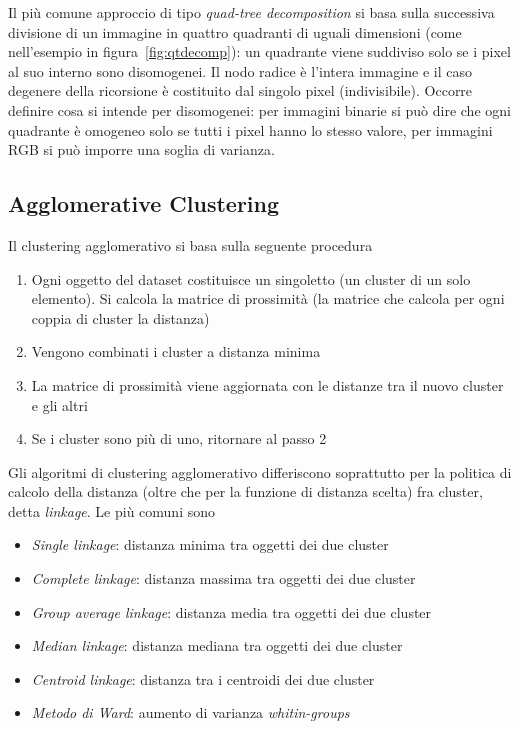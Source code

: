 \documentclass[12pt]{report}
\begin{document}
Il più comune approccio di tipo \textit{quad-tree decomposition} si basa sulla successiva divisione di un immagine in quattro quadranti di uguali dimensioni (come nell'esempio in figura~\ref{fig:qtdecomp}): un quadrante viene suddiviso solo se i pixel al suo interno sono disomogenei. Il nodo radice è l'intera immagine e il caso degenere della ricorsione è costituito dal singolo pixel (indivisibile). Occorre definire cosa si intende per disomogenei: per immagini binarie si può dire che ogni quadrante è omogeneo solo se tutti i pixel hanno lo stesso valore, per immagini RGB si può imporre una soglia di varianza.

\subsection{Agglomerative Clustering}
Il clustering agglomerativo si basa sulla seguente procedura \begin{enumerate}
	\item Ogni oggetto del dataset costituisce un singoletto (un cluster di un solo elemento). Si calcola la matrice di prossimità (la matrice che calcola per ogni coppia di cluster la distanza)
	\item Vengono combinati i cluster a distanza minima
	\item La matrice di prossimità viene aggiornata con le distanze tra il nuovo cluster e gli altri
	\item Se i cluster sono più di uno, ritornare al passo 2
\end{enumerate}
Gli algoritmi di clustering agglomerativo differiscono soprattutto per la politica di calcolo della distanza (oltre che per la funzione di distanza scelta) fra cluster, detta \textit{linkage}. Le più comuni sono\begin{itemize}
	\item \textit{Single linkage}: distanza minima tra oggetti dei due cluster
	\item \textit{Complete linkage}: distanza massima tra oggetti dei due cluster
	\item \textit{Group average linkage}: distanza media tra oggetti dei due cluster
	\item \textit{Median linkage}: distanza mediana tra oggetti dei due cluster
	\item \textit{Centroid linkage}: distanza tra i centroidi dei due cluster
	\item \textit{Metodo di Ward}: aumento di varianza \textit{whitin-groups}
\end{itemize}
\end{document}
